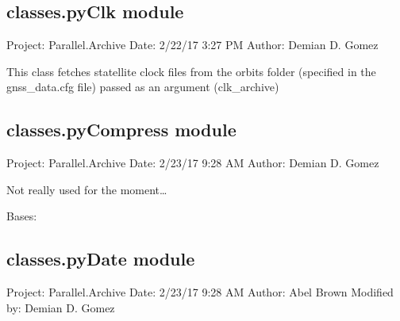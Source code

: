 \documentclass[letterpaper,10pt,english]{sphinxmanual}
\begin{document}
\subsection{classes.pyClk module}
\label{\detokenize{classes:module-classes.pyClk}}\label{\detokenize{classes:classes-pyclk-module}}
\sphinxAtStartPar
Project: Parallel.Archive
Date: 2/22/17 3:27 PM
Author: Demian D. Gomez

\sphinxAtStartPar
This class fetches statellite clock files from the orbits folder (specified in
the gnss\_data.cfg file) passed as an argument (clk\_archive)


\subsection{classes.pyCompress module}
\label{\detokenize{classes:module-classes.pyCompress}}\label{\detokenize{classes:classes-pycompress-module}}
\sphinxAtStartPar
Project: Parallel.Archive
Date: 2/23/17 9:28 AM
Author: Demian D. Gomez

\sphinxAtStartPar
Not really used for the moment…

\begin{fulllineitems}
\label{\detokenize{classes:classes.pyCompress.Compress}}
\pysigstartsignatures
{}
\pysigstopsignatures
\sphinxAtStartPar
Bases: 

\end{fulllineitems}



\subsection{classes.pyDate module}
\label{\detokenize{classes:module-classes.pyDate}}\label{\detokenize{classes:classes-pydate-module}}
\sphinxAtStartPar
Project: Parallel.Archive
Date: 2/23/17 9:28 AM
Author: Abel Brown
Modified by: Demian D. Gomez
\end{document}
